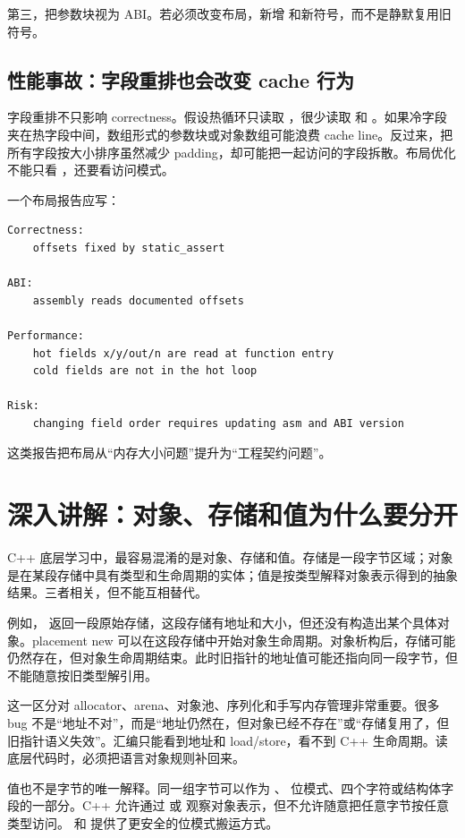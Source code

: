 第三，把参数块视为 ABI。若必须改变布局，新增  和新符号，而不是静默复用旧符号。

\subsection{性能事故：字段重排也会改变 cache 行为}

字段重排不只影响 correctness。假设热循环只读取 ，很少读取  和 。如果冷字段夹在热字段中间，数组形式的参数块或对象数组可能浪费 cache line。反过来，把所有字段按大小排序虽然减少 padding，却可能把一起访问的字段拆散。布局优化不能只看 ，还要看访问模式。

一个布局报告应写：

\begin{lstlisting}
Correctness:
    offsets fixed by static_assert

ABI:
    assembly reads documented offsets

Performance:
    hot fields x/y/out/n are read at function entry
    cold fields are not in the hot loop

Risk:
    changing field order requires updating asm and ABI version
\end{lstlisting}

这类报告把布局从“内存大小问题”提升为“工程契约问题”。

\section{深入讲解：对象、存储和值为什么要分开}

C++ 底层学习中，最容易混淆的是对象、存储和值。存储是一段字节区域；对象是在某段存储中具有类型和生命周期的实体；值是按类型解释对象表示得到的抽象结果。三者相关，但不能互相替代。

例如， 返回一段原始存储，这段存储有地址和大小，但还没有构造出某个具体对象。placement new 可以在这段存储中开始对象生命周期。对象析构后，存储可能仍然存在，但对象生命周期结束。此时旧指针的地址值可能还指向同一段字节，但不能随意按旧类型解引用。

这一区分对 allocator、arena、对象池、序列化和手写内存管理非常重要。很多 bug 不是“地址不对”，而是“地址仍然在，但对象已经不存在”或“存储复用了，但旧指针语义失效”。汇编只能看到地址和 load/store，看不到 C++ 生命周期。读底层代码时，必须把语言对象规则补回来。

值也不是字节的唯一解释。同一组字节可以作为 、 位模式、四个字符或结构体字段的一部分。C++ 允许通过  或  观察对象表示，但不允许随意把任意字节按任意类型访问。  和  提供了更安全的位模式搬运方式。

